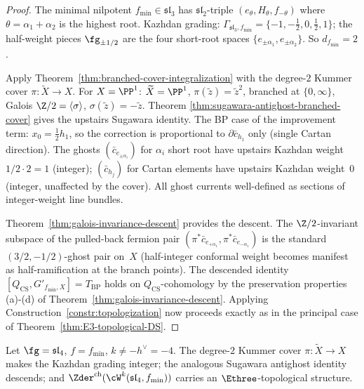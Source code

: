 \begin{proof}
The minimal nilpotent $f_{\min} \in \mathfrak{sl}_{3}$ has
$\mathfrak{sl}_{2}$-triple $(e_{\theta}, H_{\theta}, f_{-\theta})$
where $\theta = \alpha_{1} + \alpha_{2}$ is the highest root.
Kazhdan grading:
$\Gamma_{\mathfrak{sl}_{3}, f_{\min}} = \{-1, -\tfrac{1}{2}, 0,
 \tfrac{1}{2}, 1\}$; the half-weight pieces $\fg_{\pm 1/2}$ are
the four short-root spaces
$\{e_{\pm\alpha_{1}}, e_{\pm\alpha_{2}}\}$. So $d_{f_{\min}} = 2$.

Apply Theorem~\ref{thm:branched-cover-integralization} with the
degree-$2$ Kummer cover $\pi\colon \widetilde X \to X$. For $X =
\PP^{1}$: $\widetilde X = \PP^{1}$, $\pi(\tilde z) = \tilde z^{2}$,
branched at $\{0, \infty\}$, Galois $\Z/2 = \langle \sigma \rangle$,
$\sigma(\tilde z) = -\tilde z$. Theorem
\ref{thm:sugawara-antighost-branched-cover} gives the upstairs
Sugawara identity. The BP case of the improvement term:
$x_{0} = \tfrac{1}{2}h_{1}$, so the correction is proportional to
$\partial\bar c_{h_{1}}$ only (single Cartan direction). The
ghosts $(\bar c_{e_{\pm\alpha_{i}}})$ for $\alpha_{i}$ short root
have upstairs Kazhdan weight $1/2 \cdot 2 = 1$ (integer);
$(\bar c_{h_{j}})$ for Cartan elements have upstairs Kazhdan
weight~$0$ (integer, unaffected by the cover). All ghost currents
well-defined as sections of integer-weight line bundles.

Theorem~\ref{thm:galois-invariance-descent} provides the descent.
The $\Z/2$-invariant subspace of the pulled-back fermion pair
$(\pi^{*}\bar c_{e_{+\alpha_{1}}}, \pi^{*}\bar c_{e_{-\alpha_{1}}})$
is the standard $(3/2, -1/2)$-ghost pair on~$X$ (half-integer
conformal weight becomes manifest as half-ramification at the
branch points). The descended identity $[Q_{\mathrm{CS}},
G'_{f_{\min}, X}] = T_{\mathrm{BP}}$ holds on
$Q_{\mathrm{CS}}$-cohomology by the preservation properties (a)-(d)
of Theorem~\ref{thm:galois-invariance-descent}. Applying
Construction~\ref{constr:topologization} now proceeds exactly as in
the principal case of Theorem~\ref{thm:E3-topological-DS}.
\end{proof}

\begin{theorem}
\label{thm:E3-topological-DS-general-minimal-sl4}
Let $\fg = \mathfrak{sl}_{4}$, $f = f_{\min}$, $k \ne -h^{\vee} = -4$.
The degree-$2$ Kummer cover
$\pi\colon \widetilde X \to X$ makes the Kazhdan grading integer;
the analogous Sugawara antighost identity descends; and
$\Zder^{\mathrm{ch}}(\cW^{k}(\mathfrak{sl}_{4}, f_{\min}))$ carries
an $\Ethree$-topological structure.
\end{theorem}

